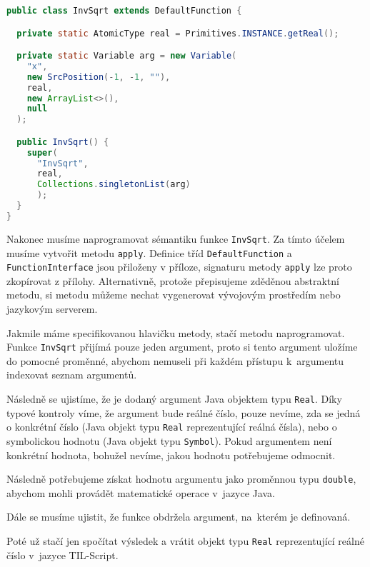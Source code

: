 \begin{lstlisting}[caption={Konstruktor InvSqrt}, language=Java]
public class InvSqrt extends DefaultFunction {

  private static AtomicType real = Primitives.INSTANCE.getReal();

  private static Variable arg = new Variable(
    "x",
    new SrcPosition(-1, -1, ""),
    real,
    new ArrayList<>(),
    null
  );

  public InvSqrt() {
    super(
      "InvSqrt",
      real,
      Collections.singletonList(arg)
      );
  }
}
\end{lstlisting}

Nakonec musíme naprogramovat sémantiku funkce \lstinline{InvSqrt}. Za tímto účelem musíme vytvořit
metodu \lstinline{apply}. Definice tříd \lstinline{DefaultFunction} a \lstinline{FunctionInterface}
jsou přiloženy v příloze, signaturu metody \lstinline{apply} lze proto zkopírovat z přílohy.
Alternativně, protože přepisujeme zděděnou abstraktní metodu, si metodu můžeme nechat
vygenerovat vývojovým prostředím nebo jazykovým serverem.

Jakmile máme specifikovanou hlavičku metody, stačí metodu naprogramovat. Funkce \lstinline{InvSqrt}
přijímá pouze jeden argument, proto si tento argument uložíme do pomocné proměnné, abychom nemuseli
při každém přístupu k~argumentu indexovat seznam argumentů.

Následně se ujistíme, že je dodaný argument Java objektem typu \lstinline{Real}. Díky typové
kontroly víme, že argument bude reálné číslo, pouze nevíme, zda se jedná o konkrétní číslo (Java
objekt typu \lstinline{Real} reprezentující reálná čísla), nebo o symbolickou hodnotu (Java objekt
typu \lstinline{Symbol}). Pokud argumentem není konkrétní hodnota, bohužel nevíme, jakou hodnotu
potřebujeme odmocnit.

Následně potřebujeme získat hodnotu argumentu jako proměnnou typu \lstinline{double}, abychom
mohli provádět matematické operace v~jazyce Java.

Dále se musíme ujistit, že funkce obdržela argument, na~kterém je definovaná.

Poté už stačí jen spočítat výsledek a vrátit objekt typu \lstinline{Real} reprezentující reálné
číslo v~jazyce TIL-Script.


